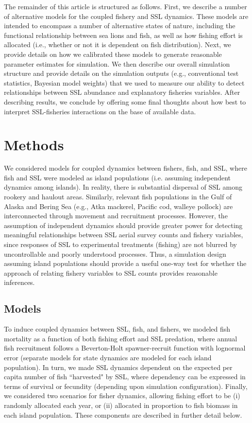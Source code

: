 \documentclass[11pt]{article}
\begin{document}
The remainder of this article is structured as follows.  First, we describe a number of alternative models for the coupled fishery and SSL dynamics.  These models are intended to encompass a number of
alternative states of nature, including the functional relationship between sea lions and fish, as well as
how fishing effort is allocated (i.e., whether or not it is dependent on fish distribution).  Next, we provide details on how we calibrated these models to generate reasonable parameter estimates for simulation.  We then describe our overall simulation structure and provide details on the simulation outputs (e.g., conventional test statistics, Bayesian model weights) that we used to measure our ability to detect relationships between SSL abundance and explanatory fisheries variables.  After describing results, we conclude by offering some final thoughts about how best to interpret SSL-fisheries interactions on the base of available data.


\section{Methods}

We considered models for coupled dynamics between fishers, fish, and SSL, where fish and SSL were modeled as island populations (i.e. assuming independent dynamics among islands).  In reality, there is substantial dispersal of SSL among rookery and haulout areas.  Similarly, relevant fish populations in the Gulf of Alaska and Bering Sea (e.g., Atka mackerel, Pacific cod, walleye pollock) are interconnected through movement and recruitment processes.  However, the assumption of independent dynamics should provide greater power for detecting meaningful relationships between SSL aerial survey counts and fishery variables, since responses of SSL to experimental treatments (fishing) are not blurred by uncontrollable and poorly understood processes.  Thus, a simulation design assuming island populations should provide a useful one-way test for whether the approach of relating fishery variables to SSL counts provides reasonable inferences.

\subsection{Models}


To induce coupled dynamics between SSL, fish, and fishers, we modeled
fish mortality as a function of both fishing effort and SSL predation, where annual fish recruitment follows a Beverton-Holt spawner-recruit function \citep{Beverton1957} with lognormal error (separate models for state dynamics are modeled for each island population).  In turn, we made SSL dynamics dependent on the expected per capita number of fish ``harvested" by SSL, where dependency can be expressed in terms of survival or fecundity (depending upon simulation configuration).  Finally, we considered two scenarios for fisher dynamics, allowing fishing effort to be (i) randomly allocated each year, or (ii) allocated in proportion to fish biomass in each island population.  These components are described in further detail below.
\end{document}
